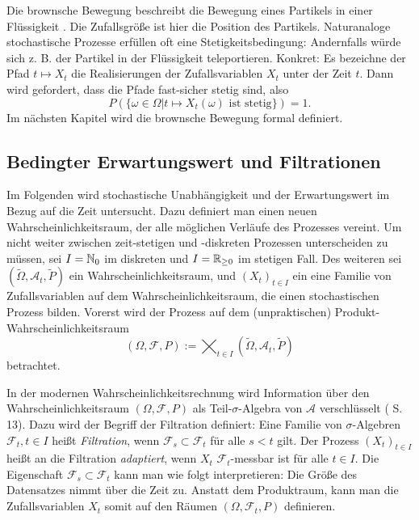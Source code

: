 \begin{bsp}
Die brownsche Bewegung beschreibt die Bewegung eines Partikels in 
einer Flüssigkeit \cite{webster_bb}. Die Zufallsgröße ist hier die Position des Partikels.
Naturanaloge stochastische Prozesse erfüllen oft eine Stetigkeitsbedingung: 
Andernfalls würde sich z. B. der Partikel in der Flüssigkeit teleportieren. 
Konkret: Es bezeichne der Pfad $t \mapsto X_t$ die Realisierungen der Zufallsvariablen $X_t$ unter 
der Zeit $t$. Dann wird gefordert, dass die Pfade fast-sicher stetig sind, also 
$$P(\{\omega \in \Omega | t \mapsto X_t(\omega) \text{ ist stetig}\}) = 1.$$ 
Im nächsten Kapitel wird die brownsche Bewegung formal definiert.
\end{bsp}

\subsection{Bedingter Erwartungswert und Filtrationen}

Im Folgenden wird stochastische Unabhängigkeit und der Erwartungswert im Bezug auf die Zeit untersucht. 
Dazu definiert man einen neuen Wahrscheinlichkeitsraum, 
der alle möglichen Verläufe des Prozesses vereint. 
Um nicht weiter zwischen zeit-stetigen und -diskreten Prozessen unterscheiden zu müssen, 
sei $I = \Bbb N_0$ im diskreten und $I = \Bbb R_{\ge 0}$ im stetigen Fall. 
Des weiteren sei $(\tilde \Omega, \mathcal A_t, \tilde P)$ ein Wahrscheinlichkeitsraum, 
und $(X_t)_{t \in I}$ ein eine Familie von Zufallsvariablen auf dem Wahrscheinlichkeitsraum, 
die einen stochastischen Prozess bilden. Vorerst wird der Prozess 
auf dem (unpraktischen) Produkt-Wahrscheinlichkeitsraum
$$(\Omega, \mathcal F, P) := \bigtimes_{t \in I}(\tilde \Omega, \mathcal A_t,\tilde P)$$
betrachtet.

\begin{defi}[Adaptiertheit]
In der modernen Wahrscheinlichkeitsrechnung wird Information über den
Wahrscheinlichkeitsraum $(\Omega, \mathcal F, P)$ als Teil-$\sigma$-Algebra 
von $\mathcal A$ verschlüsselt (\cite{behrends} S. 13). Dazu wird der Begriff der Filtration 
definiert: Eine Familie von $\sigma$-Algebren $\mathcal F_t, t \in I$ heißt \textit{Filtration}, 
wenn $\mathcal F_s \subset \mathcal F_t$ für alle $s \lt t$ gilt. 
Der Prozess $(X_t)_{t \in I}$ heißt an die Filtration \textit{adaptiert}, 
wenn $X_t$ $\mathcal F_t$-messbar ist für alle $t \in I$. Die Eigenschaft 
$\mathcal F_s \subset \mathcal F_t$ kann man wie folgt interpretieren: 
Die Größe des Datensatzes nimmt über die Zeit zu. Anstatt dem Produktraum, kann man 
die Zufallsvariablen $X_t$ somit auf den Räumen $(\Omega, \mathcal F_t, P)$ definieren.
\end{defi}

